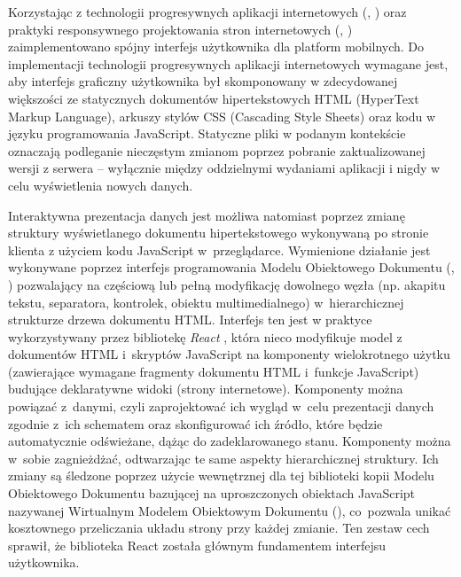 Korzystając z technologii progresywnych aplikacji internetowych (, ) oraz praktyki responsywnego projektowania stron internetowych (, ) zaimplementowano spójny interfejs użytkownika dla platform mobilnych. Do implementacji technologii progresywnych aplikacji internetowych wymagane jest, aby interfejs graficzny użytkownika był skomponowany w zdecydowanej większości ze statycznych dokumentów hipertekstowych HTML (HyperText Markup Language), arkuszy stylów CSS (Cascading Style Sheets) oraz kodu w języku programowania JavaScript. Statyczne pliki w podanym kontekście oznaczają podleganie nieczęstym zmianom poprzez pobranie zaktualizowanej wersji z serwera -- wyłącznie między oddzielnymi wydaniami aplikacji i nigdy w celu wyświetlenia nowych danych.

Interaktywna prezentacja danych jest możliwa natomiast poprzez zmianę struktury wyświetlanego dokumentu hipertekstowego wykonywaną po stronie klienta z użyciem kodu JavaScript w~przeglądarce. Wymienione działanie jest wykonywane poprzez interfejs programowania Modelu Obiektowego Dokumentu  (, ) \cite{mdn_dom_glossary} pozwalający na częściową lub pełną modyfikację dowolnego węzła (np. akapitu tekstu, separatora, kontrolek, obiektu multimedialnego) w~hierarchicznej strukturze drzewa dokumentu HTML. Interfejs ten jest w praktyce wykorzystywany przez bibliotekę \textit{React} \cite{react_thinking}, która nieco modyfikuje model z dokumentów HTML i~skryptów JavaScript na komponenty wielokrotnego użytku (zawierające wymagane fragmenty dokumentu HTML i~funkcje JavaScript) budujące deklaratywne widoki (strony internetowe). Komponenty można powiązać z~danymi, czyli zaprojektować ich wygląd w~celu prezentacji danych zgodnie z~ich schematem oraz skonfigurować ich źródło, które będzie automatycznie odświeżane, dążąc do zadeklarowanego stanu. Komponenty można w~sobie zagnieżdżać, odtwarzając te same aspekty hierarchicznej struktury. Ich zmiany są śledzone poprzez użycie wewnętrznej dla tej biblioteki kopii Modelu Obiektowego Dokumentu bazującej na uproszczonych obiektach JavaScript nazywanej Wirtualnym Modelem Obiektowym Dokumentu (), co~pozwala unikać kosztownego przeliczania układu strony przy każdej zmianie. Ten zestaw cech sprawił, że biblioteka React została głównym fundamentem interfejsu użytkownika.


